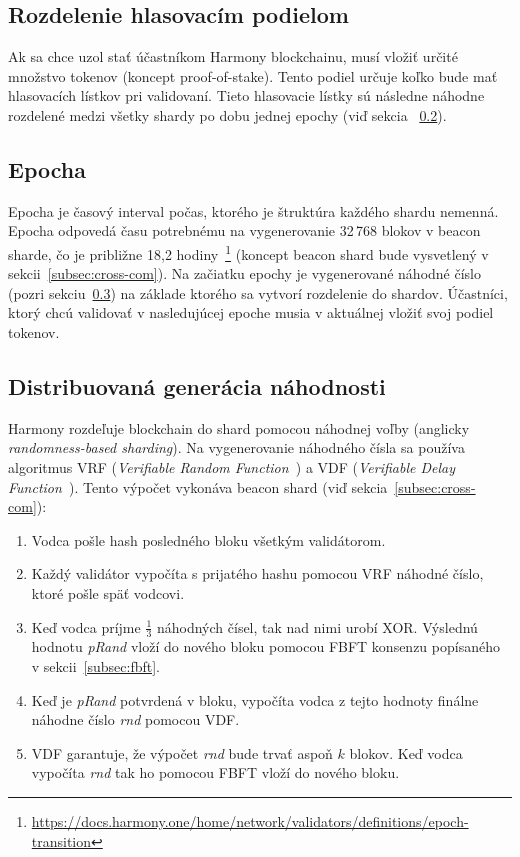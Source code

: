 \subsection{Rozdelenie hlasovacím podielom}\label{subsec:rand-dist}
Ak sa chce uzol stať účastníkom Harmony blockchainu, musí vložiť určité množstvo tokenov (koncept proof-of-stake). Tento podiel určuje koľko bude mať hlasovacích lístkov pri validovaní. Tieto hlasovacie lístky sú následne náhodne rozdelené medzi všetky shardy po dobu jednej epochy (viď sekcia ~\ref{subsec:epoch}).

\subsection{Epocha}\label{subsec:epoch}
Epocha je časový interval počas, ktorého je štruktúra každého shardu nemenná. Epocha odpovedá času potrebnému na vygenerovanie 32\,768 blokov v beacon sharde, čo je približne 18,2 hodiny~\footnote{\url{https://docs.harmony.one/home/network/validators/definitions/epoch-transition}} (koncept beacon shard bude vysvetlený v sekcii~\ref{subsec:cross-com}). Na začiatku epochy je vygenerované náhodné číslo (pozri sekciu~\ref{subsec:rnd}) na základe ktorého sa vytvorí rozdelenie do shardov. Účastníci, ktorý chcú validovať v nasledujúcej epoche musia v aktuálnej vložiť svoj podiel tokenov.

\subsection{Distribuovaná generácia náhodnosti}\label{subsec:rnd}
Harmony rozdeľuje blockchain do shard pomocou náhodnej voľby (anglicky \textit{randomness-based sharding}). Na vygenerovanie náhodného čísla sa používa algoritmus VRF (\textit{Verifiable Random Function~\cite{algorandGilad}}) a VDF (\textit{Verifiable Delay Function~\cite{vdfBoneh}}). Tento výpočet vykonáva beacon shard (viď sekcia~\ref{subsec:cross-com}):
\begin{enumerate}
	\item Vodca pošle hash posledného bloku všetkým validátorom.
	\item Každý validátor vypočíta s prijatého hashu pomocou VRF náhodné číslo, ktoré pošle späť vodcovi.
	\item Keď vodca príjme $\frac{1}{3}$ náhodných čísel, tak nad nimi urobí XOR. Výslednú hodnotu \textit{pRand} vloží do nového bloku pomocou FBFT konsenzu popísaného v sekcii~\ref{subsec:fbft}.
	\item Keď je \textit{pRand} potvrdená v bloku, vypočíta vodca z tejto hodnoty finálne náhodne číslo \textit{rnd} pomocou VDF.
	\item VDF garantuje, že výpočet \textit{rnd} bude trvať aspoň $k$ blokov. Keď vodca vypočíta \textit{rnd} tak ho pomocou FBFT vloží do nového bloku.
\end{enumerate}

